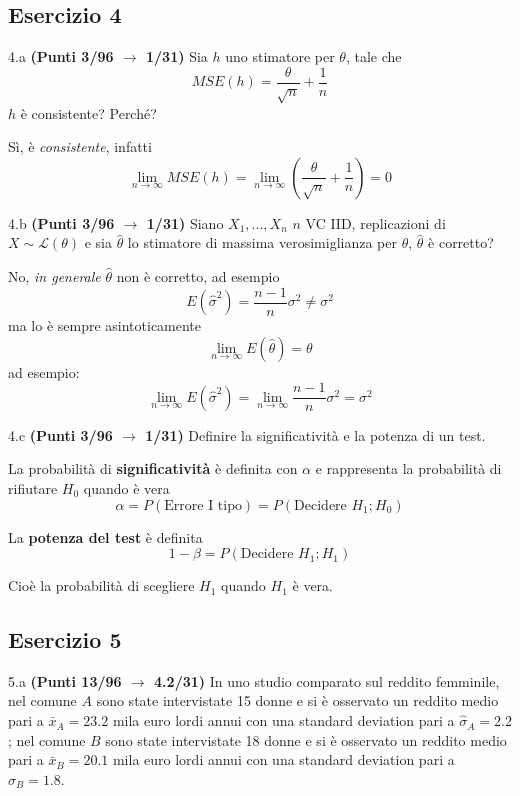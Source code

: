 \documentclass[
  11pt,
]{book}
\theoremstyle{mytheoremstyle}
\theoremstyle{mydefstyle}
\newenvironment{sol}
  {
  \begin{tcolorbox}[enhanced,breakable,arc=0.1mm,boxrule=1pt,colback=white,colframe=iblue,
  title=\bf \fontfamily{lmss}\selectfont \hspace{.5 cm} Soluzione,drop fuzzy shadow]

}{
\end{tcolorbox}
  }
\begin{document}
\subsection{Esercizio 4}\label{esercizio-4-3}

4.a \textbf{(Punti 3/96 \(\rightarrow\) 1/31)} Sia \(h\) uno stimatore per \(\theta\), tale che
\[
MSE(h)=\frac\theta {\sqrt{ n}}+\frac1n
\]
\(h\) è consistente? Perché?

\begin{sol}
Sì, è \emph{consistente}, infatti
\[
\lim_{n\to\infty}MSE(h)=\lim_{n\to\infty}\left(\frac\theta {\sqrt{ n}}+\frac1n\right)=0
\]

\end{sol}

4.b \textbf{(Punti 3/96 \(\rightarrow\) 1/31)} Siano \(X_1,...,X_n\) \(n\) VC IID, replicazioni di \(X\sim \mathscr{L}(\theta)\) e sia \(\hat\theta\) lo stimatore di massima verosimiglianza per \(\theta\),
\(\hat\theta\) è corretto?

\begin{sol}
No, \emph{in generale} \(\hat\theta\) non è corretto, ad esempio
\[
E(\hat\sigma^2)=\frac{n-1}n\sigma^2\ne\sigma^2
\]
ma lo è sempre asintoticamente
\[
\lim_{n\to\infty}E(\hat\theta)=\theta
\]
ad esempio:
\[
\lim_{n\to\infty}E(\hat\sigma^2)=\lim_{n\to\infty}\frac{n-1}n\sigma^2=\sigma^2
\]

\end{sol}

4.c \textbf{(Punti 3/96 \(\rightarrow\) 1/31)} Definire la significatività e la potenza di un test.

\begin{sol}
La probabilità di \textbf{significatività} è definita con \(\alpha\) e rappresenta la probabilità di rifiutare \(H_0\) quando è vera
\[\alpha=P(\text{Errore I tipo})=P(\text{Decidere $H_1$};H_0)\]

La \textbf{potenza del test} è definita
\[1-\beta =P(\text{Decidere $H_1$}; H_1)\]

Cioè la probabilità di scegliere \(H_1\) quando \(H_1\) è vera.

\end{sol}

\subsection{Esercizio 5}\label{esercizio-5-2}

5.a \textbf{(Punti 13/96 \(\rightarrow\) 4.2/31)} In uno studio comparato sul reddito femminile, nel comune \(A\) sono state intervistate 15 donne e si è osservato un reddito medio pari a \(\bar x_A=23.2\) mila euro lordi annui con una standard deviation pari a \(\hat\sigma_A=2.2\); nel comune \(B\) sono state intervistate 18 donne e si è osservato un reddito medio pari a \(\bar x_B=20.1\) mila euro lordi annui con una standard deviation pari a \(\hat\sigma_B=1.8\).
\end{document}
